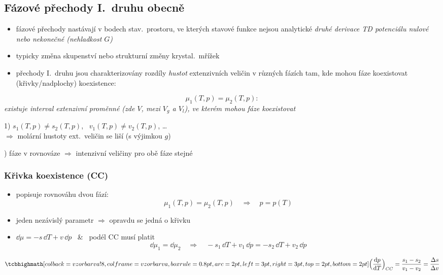 \subsection{Fázové přechody I.\ druhu obecně}
\begin{itemize}
  \item fázové přechody nastávají v bodech stav.\ prostoru, ve kterých stavové funkce nejsou analytické
        {\color{NavyBlue}\itshape\small * druhé derivace TD potenciálu nulové nebo nekonečné (nehladkost $G$)}
  \item typicky změna skupenství nebo strukturní změny krystal.\ mřížek
  \item přechody I.\ druhu jsou charakterizovány rozdíly {\small\itshape hustot} extenzivních veličin v různých fázích tam, kde mohou fáze koexistovat (křivky/nadplochy) koexistence:
\end{itemize}

\begin{minipage}{0.38\textwidth}
\[ \mu_1(T,p) = \mu_2(T,p): \]
{\color{NavyBlue}\itshape\small existuje interval extenzivní proměnné (zde $V$, mezi $V_g$ a $V_l$), ve kterém mohou fáze koexistovat}
\end{minipage}
\begin{minipage}{0.6\textwidth}
1) $s_1(T,p)\neq s_2(T,p)$, \ $v_1(T,p)\neq v_2(T,p)$, \dots \\
\hspace*{1em} $\Rightarrow$ molární hustoty ext.\ veličin se liší (s výjimkou $g$)

) fáze v rovnováze $\Rightarrow$ intenzivní veličiny pro obě fáze stejné
\end{minipage}

\subsubsection*{Křivka koexistence (CC)}
\begin{itemize}
  \item popisuje rovnováhu dvou fází:
  \[ \mu_1(T,p) = \mu_2(T,p) \quad\Rightarrow\quad p = p(T) \]
  \item jeden nezávislý parametr $\Rightarrow$ opravdu se jedná o křivku
  \item $\dd\mu = -s\,\dd T + v\,\dd p$ \ \& \ podél CC musí platit
  \[ \dd\mu_1 = \dd\mu_2 \quad\Rightarrow\quad -s_1\,\dd T + v_1\,\dd p = -s_2\,\dd T + v_2\,\dd p \]
\end{itemize}
\begin{veta}
\[ \vzorec{\Big(\frac{\dd p}{\dd T}\Big)_{CC} = \frac{s_1 - s_2}{v_1 - v_2} = \frac{\Delta s}{\Delta v}} \]
\end{veta}

